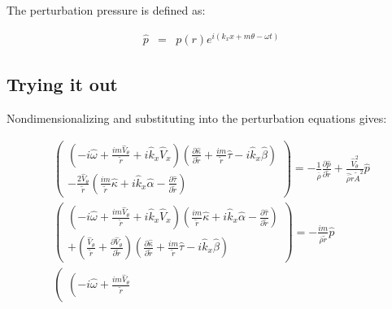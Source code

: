 \documentclass[12pt]{article}
\begin{document}
The perturbation pressure is defined as:

\begin{eqnarray}
\widehat{p} &=& p \left(r \right) 
e^{i \left(k_x x + m \theta - \omega t \right)} 
\nonumber
\end{eqnarray}

\subsection{Trying it out}

Nondimensionalizing and substituting into the perturbation equations gives:

\begin{small}
\begin{eqnarray}
\left(
\begin{array}{r}
\left(
-i \widehat{\omega} 
+ \frac{i m \widehat{V}_{\theta}}{\widetilde{r}}
+i \widehat{k}_x \widehat{V}_x 
\right) 
\left(
\frac{\partial \widehat{\kappa}}{\partial \widetilde{r}}
+
\frac{i m}{\widetilde{r}}
\widehat{\tau}
-
i \widehat{k}_x \widehat{\beta}
\right) 
\\
-\frac{2 \widehat{V}_{\theta}}{\widetilde{r}} 
\left(
\frac{i m}{\widetilde{r}} \widehat{\kappa}
+
i \widehat{k}_x \widehat{\alpha}
-
\frac{\partial \widehat{\tau}}{\partial \widetilde{r}}
\right) 
\end{array}
\right)
 = 
-\frac{1}{\widehat{\overline{\rho}}} \frac{\partial \widehat{p}}{\partial \widetilde{r}}
+\frac{\widehat{V}_{\theta}^2}{\widehat{\overline{\rho}} \widetilde{r} \widetilde{A}^2} 
\widehat{p}
\nonumber
\\
\left(
\begin{array}{r}
\left(
-i \widehat{\omega} 
+ \frac{i m \widehat{V}_{\theta}}{\widetilde{r}}
+i \widehat{k}_x \widehat{V}_x 
\right) 
\left(
\frac{i m}{\widetilde{r}} \widehat{\kappa}
+
i \widehat{k}_x \widehat{\alpha}
-
\frac{\partial \widehat{\tau}}{\partial \widetilde{r}}
\right) 
\\
+
\left(
\frac{\widehat{V}_{\theta}}{\widetilde{r}}
+\frac{\partial \widehat{V}_{\theta}}{\partial \widetilde{r}}
\right) 
\left(
\frac{\partial \widehat{\kappa}}{\partial \widetilde{r}}
+
\frac{i m}{\widetilde{r}}
\widehat{\tau}
-
i \widehat{k}_x \widehat{\beta}
\right) 
\end{array}
\right)
 = 
-\frac{i m}{\widehat{\overline{\rho}} \widetilde{r}} \widehat{p}
\nonumber
\\
\left(
\begin{array}{r}
\left(
-i \widehat{\omega}
+ \frac{i m \widehat{V}_{\theta}}{\widetilde{r}}

\end{array}
\end{eqnarray}
\end{small}
\end{document}
